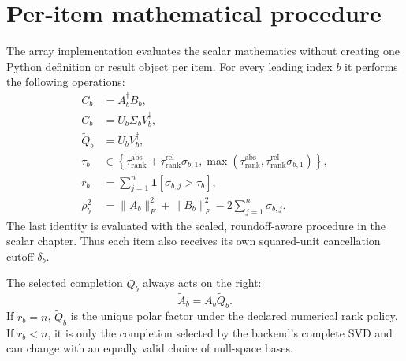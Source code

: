 \section{Per-item mathematical procedure}
The array implementation evaluates the scalar mathematics without creating one Python
definition or result object per item. For every leading index $b$ it performs the
following operations:
\begin{align*}
  C_b &= A_b^\dagger B_b,\\
  C_b &= U_b\Sigma_bV_b^\dagger,\\
  \widetilde Q_b &= U_bV_b^\dagger,\\
  \tau_b &\in \left\{
    \tau_{\mathrm{rank}}^{\mathrm{abs}}
      +\tau_{\mathrm{rank}}^{\mathrm{rel}}\sigma_{b,1},
    \max\!\left(\tau_{\mathrm{rank}}^{\mathrm{abs}},
      \tau_{\mathrm{rank}}^{\mathrm{rel}}\sigma_{b,1}\right)
  \right\},\\
  r_b &= \sum_{j=1}^{n}\mathbf{1}[\sigma_{b,j}>\tau_b],\\
  \rho_b^2 &= \lVert A_b\rVert_F^2+\lVert B_b\rVert_F^2
    -2\sum_{j=1}^{n}\sigma_{b,j}.
\end{align*}
The last identity is evaluated with the scaled, roundoff-aware procedure in the scalar
chapter. Thus each item also receives its own squared-unit cancellation cutoff
$\delta_b$.

The selected completion $\widetilde Q_b$ always acts on the right:
\[
  \widetilde A_b=A_b\widetilde Q_b.
\]
If $r_b=n$, $\widetilde Q_b$ is the unique polar factor under the declared numerical
rank policy. If $r_b<n$, it is only the completion selected by the backend's complete
SVD and can change with an equally valid choice of null-space bases.

